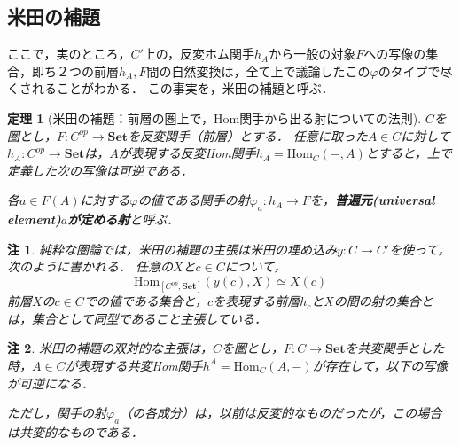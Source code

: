\documentclass[uplatex, 12pt, dvipdfmx]{jsreport}
\newtheorem{theorem}{定理} \newtheorem{definition}{定義} \newtheorem{axiom}[definition]{公理} \newtheorem{proposition}[theorem]{命題} \newtheorem{corollary}[theorem]{系} \newtheorem{lemma}[theorem]{補題} \newtheorem{problem}{問} \newtheorem{solution}{解} \newtheorem{remark}{注} \newtheorem{example}{例}
\begin{document}
\subsection{米田の補題}

ここで，実のところ，$C'$上の，反変ホム関手$h_A$から一般の対象$F$への写像の集合，即ち２つの前層$h_A,F$間の自然変換は，全て上で議論したこの$\varphi$のタイプで尽くされることがわかる．
この事実を，米田の補題と呼ぶ．
\begin{shadebox}\begin{theorem}[米田の補題：前層の圏上で，Hom関手から出る射についての法則]\label{Yoneda's-lemma}\rm{}
    $C$を圏とし，$F:C^{op}\to\mathbf{Set}$を反変関手（前層）とする．
    任意に取った$A\in C$に対して$h_A:C^{op}\to\mathbf{Set}$は，$A$が表現する反変Hom関手$h_A=\mathrm{Hom}_C(-,A)$とすると，上で定義した次の写像は可逆である．
    \begin{center}\end{center}
    各$a\in F(A)$に対する$\varphi$の値である関手の射$\varphi_a:h_A\to F$を，\textbf{普遍元(universal element)$a$が定める射}と呼ぶ．
\end{theorem}\end{shadebox}
\begin{remark}
    純粋な圏論では，米田の補題の主張は米田の埋め込み$y:C\to C'$を使って，次のように書かれる．
    任意の$X$と$c\in C$について，$$\mathrm{Hom}_{[C^{op},\mathbf{Set}]}(y(c),X)\simeq X(c)$$
    前層$X$の$c\in C$での値である集合と，$c$を表現する前層$h_c$と$X$の間の射の集合とは，集合として同型であること主張している．
\end{remark}
\begin{remark}\rm{}
    米田の補題の双対的な主張は，$C$を圏とし，$F:C\to\mathbf{Set}$を共変関手とした時，$A\in C$が表現する共変Hom関手$h^A=\mathrm{Hom}_C(A,-)$が存在して，以下の写像が可逆になる．
    \begin{center}\end{center}
    ただし，関手の射$\varphi_a$（の各成分）は，以前は反変的なものだったが，この場合は共変的なものである．
    \begin{center}\end{center}
\end{remark}
\end{document}
